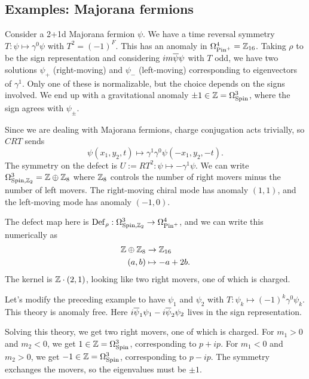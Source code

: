 \subsection{Examples: Majorana fermions}

\begin{ex}
	Consider a 2+1d Majorana fermion $\psi$.
	We have a time reversal symmetry $T: \psi \mapsto \gamma^0 \psi$ with $T^2 = (-1)^F$.
	This has an anomaly in $\Omega^4_{\mathrm{Pin}^+} = \mathbb{Z}_{16}$.
	Taking $\rho$ to be the sign representation and considering $i m \overline{\psi} \psi$ with $T$ odd, we have two solutions $\psi_+$ (right-moving) and $\psi_-$ (left-moving) corresponding to eigenvectors of $\gamma^1$.
	Only one of these is normalizable, but the choice depends on the signs involved.
	We end up with a gravitational anomaly $\pm 1 \in \mathbb{Z} = \Omega^3_{\mathrm{Spin}}$, where the sign agrees with $\psi_{\pm}$.

	Since we are dealing with Majorana fermions, charge conjugation acts trivially, so $CRT$ sends
	\[
		\psi(x_1, y_2, t) \mapsto \gamma^1 \gamma^0 \psi(-x_1, y_2, -t).
	\]
	The symmetry on the defect is $U := RT^2: \psi \mapsto -\gamma^1 \psi$.
	We can write $\Omega^3_{\mathrm{Spin},\mathbb{Z}_2} = \mathbb{Z} \oplus \mathbb{Z}_8$ where $\mathbb{Z}_8$ controls the number of right movers minus the number of left movers.
	The right-moving chiral mode has anomaly $(1, 1)$, and the left-moving mode has anomaly $(-1, 0)$.

	The defect map here is $\operatorname{Def}_\rho: \Omega^3_{\mathrm{Spin},\mathbb{Z}_2} \to \Omega^4_{\mathrm{Pin}^+}$, and we can write this numerically as
	\begin{align*}
		\mathbb{Z} \oplus \mathbb{Z}_8 &\to \mathbb{Z}_{16} \\
		(a, b) &\mapsto -a + 2b.
	\end{align*}
	The kernel is $\mathbb{Z} \cdot (2, 1)$, looking like two right movers, one of which is charged.
\end{ex}

\begin{ex}
	Let's modify the preceding example to have $\psi_1$ and $\psi_2$ with $T: \psi_k \mapsto (-1)^k \gamma^0 \psi_k$.
	This theory is anomaly free.
	Here $i \overline{\psi}_1 \psi_1 - i \overline{\psi}_2 \psi_2$ lives in the sign representation.
	
	Solving this theory, we get two right movers, one of which is charged.
	For $m_1 > 0$ and $m_2 < 0$, we get $1 \in \mathbb{Z} = \Omega^3_{\mathrm{Spin}}$, corresponding to $p + ip$.
	For $m_1 < 0$ and $m_2 > 0$, we get $-1 \in \mathbb{Z} = \Omega^3_{\mathrm{Spin}}$, corresponding to $p - ip$.
	The symmetry exchanges the movers, so the eigenvalues must be $\pm 1$.
\end{ex}

